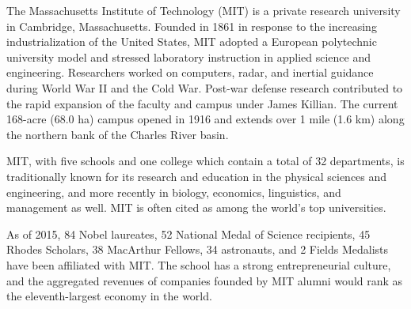 
\large The Massachusetts Institute of Technology (MIT) is a private research university in Cambridge, Massachusetts. Founded in 1861 in response to the increasing industrialization of the United States, MIT adopted a European polytechnic university model and stressed laboratory instruction in applied science and engineering. Researchers worked on computers, radar, and inertial guidance during World War II and the Cold War. Post-war defense research contributed to the rapid expansion of the faculty and campus under James Killian. The current 168-acre (68.0 ha) campus opened in 1916 and extends over 1 mile (1.6 km) along the northern bank of the Charles River basin.

MIT, with five schools and one college which contain a total of 32 departments, is traditionally known for its research and education in the physical sciences and engineering, and more recently in biology, economics, linguistics, and management as well. MIT is often cited as among the world's top universities.

As of 2015, 84 Nobel laureates, 52 National Medal of Science recipients, 45 Rhodes Scholars, 38 MacArthur Fellows, 34 astronauts, and 2 Fields Medalists have been affiliated with MIT. The school has a strong entrepreneurial culture, and the aggregated revenues of companies founded by MIT alumni would rank as the eleventh-largest economy in the world.

\pagebreak
